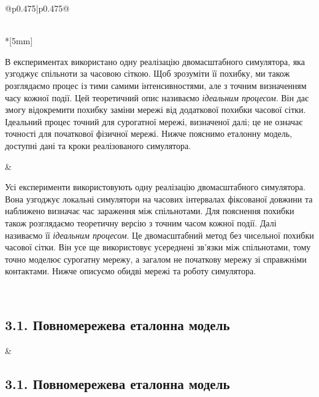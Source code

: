 \documentclass[11pt]{article}
\begin{document}
\begin{longtable}{@{}p{0.475\textwidth}|p{0.475\textwidth}@{}}
\begin{minipage}[t]{\linewidth}
\end{minipage} \\*[5mm]
\begin{minipage}[t]{\linewidth}
В експериментах використано одну реалізацію двомасштабного симулятора, яка узгоджує спільноти за часовою сіткою. Щоб зрозуміти її похибку, ми також розглядаємо процес із тими самими інтенсивностями, але з точним визначенням часу кожної події. Цей теоретичний опис називаємо \emph{ідеальним процесом}. Він дає змогу відокремити похибку заміни мережі від додаткової похибки часової сітки. Ідеальний процес точний для сурогатної мережі, визначеної далі; це не означає точності для початкової фізичної мережі. Нижче пояснимо еталонну модель, доступні дані та кроки реалізованого симулятора.
\end{minipage} &
\begin{minipage}[t]{\linewidth}
Усі експерименти використовують одну реалізацію двомасштабного симулятора. Вона узгоджує локальні симулятори на часових інтервалах фіксованої довжини та наближено визначає час зараження між спільнотами. Для пояснення похибки також розглядаємо теоретичну версію з точним часом кожної події. Далі називаємо її \emph{ідеальним процесом}. Це двомасштабний метод без чисельної похибки часової сітки. Він усе ще використовує усереднені зв'язки між спільнотами, тому точно моделює сурогатну мережу, а загалом не початкову мережу зі справжніми контактами. Нижче описуємо обидві мережі та роботу симулятора.
\end{minipage} \\[5mm]
\begin{minipage}[t]{\linewidth}
\subsection*{3.1. Повномережева еталонна модель}

\end{minipage} &
\begin{minipage}[t]{\linewidth}
\subsection*{3.1. Повномережева еталонна модель}


\end{minipage}
\end{longtable}
\end{document}
